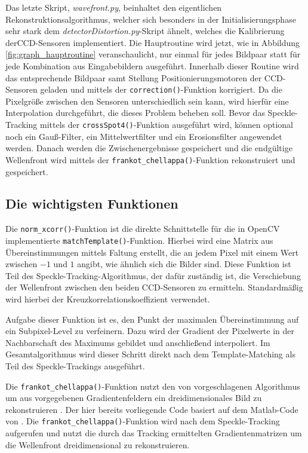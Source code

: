 Das letzte Skript, \textit{wavefront.py}, beinhaltet den eigentlichen Rekonstruktionsalgorithmus, welcher sich besonders in der Initialisierungsphase sehr stark dem \textit{detectorDistortion.py}-Skript ähnelt, welches die Kalibrierung der\gls{CCD}-Sensoren implementiert. Die Hauptroutine wird jetzt, wie in Abbildung \ref{fig:graph_hauptroutine} veranschaulicht, nur einmal für jedes Bildpaar statt für jede Kombination aus Eingabebildern ausgeführt. Innerhalb dieser Routine wird das entsprechende Bildpaar samt Stellung Positionierungsmotoren der \gls{CCD}-Sensoren geladen und mittels der \texttt{correction()}-Funktion korrigiert. Da die Pixelgröße zwischen den Sensoren unterschiedlich sein kann, wird hierfür eine Interpolation durchgeführt, die dieses Problem beheben soll. Bevor das Speckle-Tracking mittels der \texttt{crossSpot4()}-Funktion ausgeführt wird, können optional noch ein Gauß-Filter, ein Mittelwertfilter und ein Erosionsfilter angewendet werden. Danach werden die Zwischenergebnisse gespeichert und die endgültige Wellenfront wird mittels der \texttt{frankot\_chellappa()}-Funktion rekonstruiert und gespeichert. 

\subsection{Die wichtigsten Funktionen}

Die \texttt{norm\_xcorr()}-Funktion ist die direkte Schnittstelle für die in OpenCV implementierte \texttt{matchTemplate()}-Funktion. Hierbei wird eine Matrix aus Übereinstimmungen mittels Faltung erstellt, die an jedem Pixel mit einem Wert zwischen $-1$ und $1$ angibt, wie ähnlich sich die Bilder sind. Diese Funktion ist Teil des Speckle-Tracking-Algorithmus, der dafür zuständig ist, die Verschiebung der Wellenfront zwischen den beiden \gls{CCD}-Sensoren zu ermitteln. Standardmäßig wird hierbei der Kreuzkorrelationskoeffizient verwendet. 

Aufgabe dieser Funktion ist es, den Punkt der maximalen Übereinstimmung auf ein Subpixel-Level zu verfeinern. Dazu wird der Gradient der Pixelwerte in der Nachbarschaft des Maximums gebildet und anschließend interpoliert. Im Gesamtalgorithmus wird dieser Schritt direkt nach dem Template-Matching als Teil des Speckle-Trackings ausgeführt.

Die \texttt{frankot\_chellappa()}-Funktion nutzt den von \citeauthor{FC88} vorgeschlagenen Algorithmus um aus vorgegebenen Gradientenfeldern ein dreidimensionales Bild zu rekonstruieren \cite{FC88}. Der hier bereits vorliegende Code basiert auf dem Matlab-Code von \citeauthor{Kov04} \cite{Kov04}. Die \texttt{frankot\_chellappa()}-Funktion wird nach dem Speckle-Tracking aufgerufen und nutzt die durch das Tracking ermittelten Gradientenmatrizen um die Wellenfront dreidimensional zu rekonstruieren. 